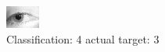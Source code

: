 \begin{figure}[h!]
\begin{center}
\includegraphics[width=0.60\columnwidth]{figures/ID1410_class_4_target_3.png}
\end{center}
\caption{ Classification: 4 actual target: 3}
\label{fig:ID1410_class_4_target_3}
\end{figure}
